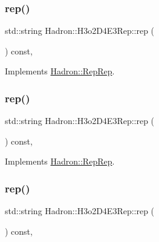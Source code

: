 \subsubsection{\texorpdfstring{rep()}{rep()}\hspace{0.1cm}{\footnotesize\ttfamily [1/3]}}
{\footnotesize\ttfamily std\+::string Hadron\+::\+H3o2\+D4\+E3\+Rep\+::rep (\begin{DoxyParamCaption}{ }\end{DoxyParamCaption}) const\hspace{0.3cm}{\ttfamily [inline]}, {\ttfamily [virtual]}}



Implements \mbox{\hyperlink{structHadron_1_1RepRep_ab3213025f6de249f7095892109575fde}{Hadron\+::\+Rep\+Rep}}.

\mbox{\label{structHadron_1_1H3o2D4E3Rep_ab7eff64255c6e04c36a08a7222b349ad}} 
\subsubsection{\texorpdfstring{rep()}{rep()}\hspace{0.1cm}{\footnotesize\ttfamily [2/3]}}
{\footnotesize\ttfamily std\+::string Hadron\+::\+H3o2\+D4\+E3\+Rep\+::rep (\begin{DoxyParamCaption}{ }\end{DoxyParamCaption}) const\hspace{0.3cm}{\ttfamily [inline]}, {\ttfamily [virtual]}}



Implements \mbox{\hyperlink{structHadron_1_1RepRep_ab3213025f6de249f7095892109575fde}{Hadron\+::\+Rep\+Rep}}.

\mbox{\label{structHadron_1_1H3o2D4E3Rep_ab7eff64255c6e04c36a08a7222b349ad}} 
\subsubsection{\texorpdfstring{rep()}{rep()}\hspace{0.1cm}{\footnotesize\ttfamily [3/3]}}
{\footnotesize\ttfamily std\+::string Hadron\+::\+H3o2\+D4\+E3\+Rep\+::rep (\begin{DoxyParamCaption}{ }\end{DoxyParamCaption}) const\hspace{0.3cm}{\ttfamily [inline]}, {\ttfamily [virtual]}}



